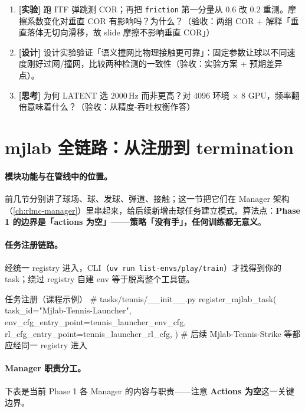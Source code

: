 \begin{practice}[本节动手任务]
\begin{enumerate}
  \item \textbf{[实验]} 跑 ITF 弹跳测 COR；再把 \verb|friction| 第一分量从 $0.6$ 改 $0.2$ 重测。摩擦系数变化对垂直 COR 有影响吗？为什么？（验收：两组 COR + 解释「垂直落体无切向滑移，故 slide 摩擦不影响垂直 COR」）
  \item \textbf{[设计]} 设计实验验证「语义撞网比物理接触更可靠」：固定参数让球以不同速度刚好过网/撞网，比较两种检测的一致性（验收：实验方案 + 预期差异点）。
  \item \textbf{[思考]} 为何 LATENT 选 $2000$\,Hz 而非更高？对 $4096$ 环境 $\times$ $8$ GPU，频率翻倍意味着什么？（验收：从精度-吞吐权衡作答）
\end{enumerate}
\end{practice}

\section{mjlab 全链路：从注册到 termination}
\label{sec:rlmc-tennis-manager}

\paragraph{模块功能与在管线中的位置。}前几节分别讲了球场、球、发球、弹道、接触；这一节把它们在 Manager 架构（\cref{ch:rlmc-manager}）里串起来，给后续新增击球任务建立模式。算法点：\textbf{Phase 1 的边界是「actions 为空」——策略「没有手」，任何训练都无意义}。

\paragraph{任务注册链路。}经统一 registry 进入，CLI（\verb|uv run list-envs/play/train|）才找得到你的 task；绕过 registry 自建 env 等于脱离整个工具链。

\begin{codebox}[Python]{任务注册（课程示例）}
# tasks/tennis/__init__.py
register_mjlab_task(
    task_id="Mjlab-Tennis-Launcher",
    env_cfg_entry_point=tennis_launcher_env_cfg,
    rl_cfg_entry_point=tennis_launcher_rl_cfg,
)
# 后续 Mjlab-Tennis-Strike 等都应经同一 registry 进入
\end{codebox}

\paragraph{Manager 职责分工。}下表是当前 Phase 1 各 Manager 的内容与职责——注意 \textbf{Actions 为空}这一关键边界。

